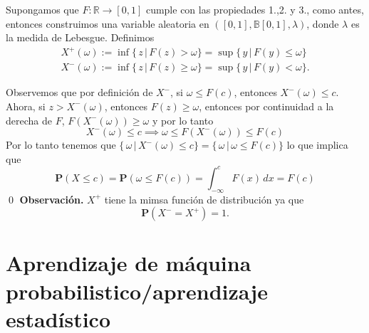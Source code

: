 \documentclass[letterpaper]{book}
\newcommand{\prob}{\textbf{P}}
\newcommand{\obs}{{\newline \noindent \sc \textbf{Observación. }}}
\newcommand{\re}{\ensuremath{\mathbb R }}
\begin{document}
Supongamos que \(F:\re\rightarrow[0,1]\) cumple con las propiedades 1.,2. y 3., como antes, entonces construimos una variable aleatoria en \(([0,1],\mathbb{B}[0,1],\lambda)\), donde \(\lambda\) es la medida de Lebesgue. Definimos
\begin{align*}
    X^{+}(\omega):=\inf\{\,z\,\vert\,F(z)>\omega\}=\sup\{\,y\,\vert\,F(y)\leq\omega\}\\
    X^{-}(\omega):=\inf\{\,z\,\vert\,F(z)\geq\omega\}=\sup\{\,y\,\vert\,F(y)<\omega\}.
\end{align*}

Observemos que por definición de \(X^{-}\), si \(\omega\leq F(c)\), entonces \(X^{-}(\omega)\leq c\). Ahora, si \(z>X^{-}(\omega)\), entonces \(F(z)\geq\omega\), entonces por continuidad a la derecha de \(F\), \(F(X^{-}(\omega))\geq\omega\) y por lo tanto
\[
     X^{-}(\omega)\leq c \implies \omega\leq F(X^{-}(\omega))\leq F(c)
\]
Por lo tanto tenemos que \(\{\,\omega\,\vert\,X^{-}(\omega)\leq c\}=\{\,\omega\,\vert\,\omega\leq F(c)\}\) lo que implica que
\[
    \prob(X\leq c)=\prob(\omega\leq F(c))=\int_{-\infty}^c F(x)\,dx=F(c)
\]
\qed
\obs \(X^{+}\) tiene la mimsa función de distribución ya que
\[
\prob(X^{-} = X^{+})=1.
\]
\part{Aprendizaje de máquina probabilistico/aprendizaje estadístico}
\label{sec:orgd247d55}
\end{document}
